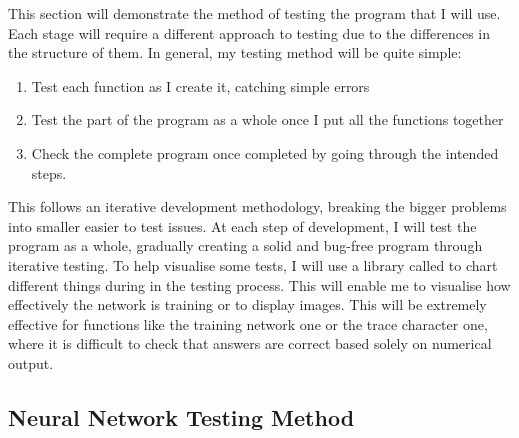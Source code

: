 \documentclass{report}
\begin{document}
This section will demonstrate the method of testing the program that I will use. Each stage will require a different approach to testing due to the differences in the structure of them.
\newline
In general, my testing method will be quite simple:
\begin{enumerate}
    \item Test each function as I create it, catching simple errors
    \item Test the part of the program as a whole once I put all the functions together
    \item Check the complete program once completed by going through the intended steps.
\end{enumerate}
This follows an iterative development methodology, breaking the bigger problems into smaller easier to test issues. At each step of development, I will test the program as a whole, gradually creating a solid and bug-free program through iterative testing.
\newline
To help visualise some tests, I will use a library called  to chart different things during in the testing process. This will enable me to visualise how effectively the network is training or to display images. This will be extremely effective for functions like the training network one or the trace character one, where it is difficult to check that answers are correct based solely on numerical output.

\subsection{Neural Network Testing Method}
\end{document}
